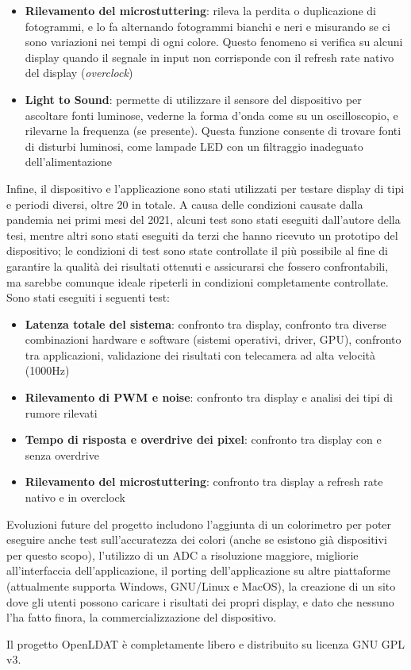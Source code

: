 \documentclass[a4paper]{article}
\begin{document}
\begin{itemize}
	\item \textbf{Rilevamento del microstuttering}: rileva la perdita o duplicazione di fotogrammi, e lo fa alternando fotogrammi bianchi e neri e misurando se ci sono variazioni nei tempi di ogni colore. Questo fenomeno si verifica su alcuni display quando il segnale in input non corrisponde con il refresh rate nativo del display (\textit{overclock})
	\item \textbf{Light to Sound}: permette di utilizzare il sensore del dispositivo per ascoltare fonti luminose, vederne la forma d'onda come su un oscilloscopio, e rilevarne la frequenza (se presente). Questa funzione consente di trovare fonti di disturbi luminosi, come lampade LED con un filtraggio inadeguato dell'alimentazione
\end{itemize}

Infine, il dispositivo e l'applicazione sono stati utilizzati per testare display di tipi e periodi diversi, oltre 20 in totale. A causa delle condizioni causate dalla pandemia nei primi mesi del 2021, alcuni test sono stati eseguiti dall'autore della tesi, mentre altri sono stati eseguiti da terzi che hanno ricevuto un prototipo del dispositivo; le condizioni di test sono state controllate il più possibile al fine di garantire la qualità dei risultati ottenuti e assicurarsi che fossero confrontabili, ma sarebbe comunque ideale ripeterli in condizioni completamente controllate. Sono stati eseguiti i seguenti test:\begin{itemize}
	\item \textbf{Latenza totale del sistema}: confronto tra display, confronto tra diverse combinazioni hardware e software (sistemi operativi, driver, GPU), confronto tra applicazioni, validazione dei risultati con telecamera ad alta velocità (1000Hz)
	\item \textbf{Rilevamento di PWM e noise}: confronto tra display e analisi dei tipi di rumore rilevati
	\item \textbf{Tempo di risposta e overdrive dei pixel}: confronto tra display con e senza overdrive
	\item \textbf{Rilevamento del microstuttering}: confronto tra display a refresh rate nativo e in overclock
\end{itemize}

Evoluzioni future del progetto includono l'aggiunta di un colorimetro per poter eseguire anche test sull'accuratezza dei colori (anche se esistono già dispositivi per questo scopo), l'utilizzo di un ADC a risoluzione maggiore, migliorie all'interfaccia dell'applicazione, il porting dell'applicazione su altre piattaforme (attualmente supporta Windows, GNU/Linux e MacOS), la creazione di un sito dove gli utenti possono caricare i risultati dei propri display, e dato che nessuno l'ha fatto finora, la commercializzazione del dispositivo.

Il progetto OpenLDAT è completamente libero e distribuito su licenza GNU GPL v3.
\end{document}
